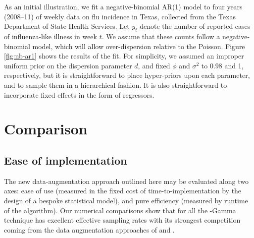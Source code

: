 As an initial illustration, we fit a negative-binomial AR(1) model to four years
(2008--11) of weekly data on flu incidence in Texas, collected from the Texas
Department of State Health Services.  Let $y_t$ denote the number of reported
cases of influenza-like illness in week $t$.  We assume that these counts follow
a negative-binomial model, which will allow over-dispersion relative to the
Poisson.
Figure \ref{fig:nb-ar1} shows the results of the fit. For simplicity, we assumed
an improper uniform prior on the dispersion parameter $d$, and fixed $\phi$ and
$\sigma^2$ to $0.98$ and 1, respectively, but it is straightforward to place
hyper-priors upon each parameter, and to sample them in a hierarchical fashion.
It is also straightforward to incorporate fixed effects in the form of
regressors.


\section{Comparison}

\subsection{Ease of implementation}

The new data-augmentation approach outlined here may be evaluated along two
axes: ease of use (measured in the fixed cost of time-to-implementation by the
design of a bespoke statistical model), and pure efficiency (measured by runtime
of the algorithm).  Our numerical comparisons show that for all the \Polya-Gamma
technique has excellent effective sampling rates with its strongest competition
coming from the data augmentation approaches of \cite{fussl-etal-2013} and
\cite{fruhwirth-schnatter-etal-2009}.

